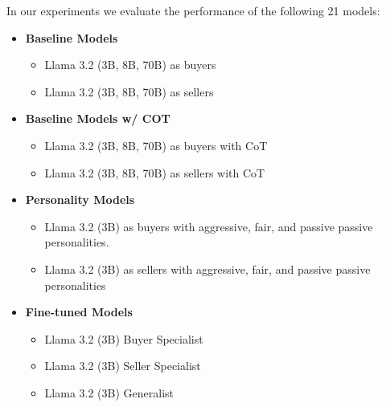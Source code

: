 \documentclass[11pt]{article}
\begin{document}
In our experiments we evaluate the performance of the following 21 models: 
\begin{itemize}
    \item \textbf{Baseline Models}
    \begin{itemize}
        \item Llama 3.2 (3B, 8B, 70B) as buyers
        \item Llama 3.2 (3B, 8B, 70B) as sellers
    \end{itemize}

    \item \textbf{Baseline Models w/ COT} 
    \begin{itemize}
        \item Llama 3.2 (3B, 8B, 70B) as buyers with CoT 
        \item Llama 3.2 (3B, 8B, 70B) as sellers with CoT
    \end{itemize}
    
    \item \textbf{Personality Models} 
    \begin{itemize}
        \item Llama 3.2 (3B) as buyers with aggressive, fair, and passive passive personalities.
        \item Llama 3.2 (3B) as sellers with aggressive, fair, and passive passive personalities
    \end{itemize}

    \item \textbf{Fine-tuned Models} 
    \begin{itemize}
        \item Llama 3.2 (3B) Buyer Specialist
        \item Llama 3.2 (3B) Seller Specialist
        \item Llama 3.2 (3B) Generalist
    \end{itemize}
\end{itemize}
\end{document}

